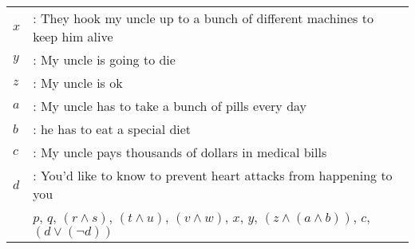 \documentclass{article}
\begin{document}
\begin{itemize}
\begin{center}
\begin{NiceTabular}{l l}
			      $x$ & : They hook my uncle up to a bunch of different machines to keep him alive                                               \\
			      $y$ & : My uncle is going to die                                                                                               \\
			      $z$ & : My uncle is ok                                                                                                         \\
			      $a$ & : My uncle has to take a bunch of pills every day                                                                        \\
			      $b$ & : he has to eat a special diet                                                                                           \\
			      $c$ & : My uncle pays thousands of dollars in medical bills                                                                    \\
			      $d$ & : You'd like to know to prevent heart attacks from happening to you                                                      \\
			      \hline
			          & $p$, $q$, $(r \wedge s)$, $(t \wedge u)$, $(v \wedge w)$, $x$, $y$, $(z \wedge (a \wedge b))$, $c$, $(d \vee (\lnot d))$
		      \end{NiceTabular}
	      \end{center}
\end{itemize}
\end{document}
